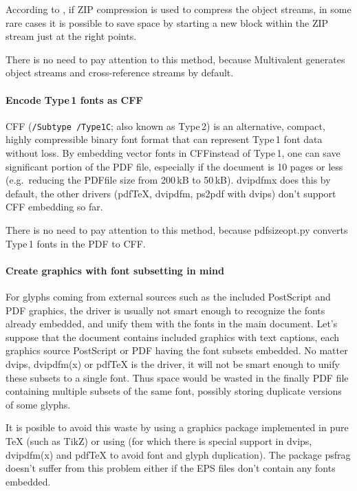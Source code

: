 \documentclass{ltugproc}
\def\cmd{\textsf}
\def\pkg{\textsf}
\begin{document}
According to \cite{pdf-diet}, if ZIP compression is used to compress the object
streams, in some rare cases it is possible to save space by starting a new
block within the ZIP stream just at the right points.

There is no need to pay attention to this method, because
Multivalent generates object streams and cross-reference streams by default.

\paragraph{Encode Type\,1 fonts as CFF}

CFF \cite{cff} (\texttt{/Subtype /Type1C}; also known as Type\,2) 
is an alternative, compact, highly compressible binary font
format that can represent Type\,1 font data without loss. By embedding
vector fonts in CFFinstead of Type\,1, one can
save significant portion of the PDF file, especially if the document is 10
pages or less (e.g.\ reducing the PDFfile size from 200\,kB to 50\,kB).
\cmd{dvipdfmx} does this by default, the other drivers (pdf\TeX{},
\cmd{dvipdfm}, \cmd{ps2pdf} with \cmd{dvips}) don't support CFF embedding so
far.

There is no need to pay attention to this method, because
\cmd{pdfsizeopt.py} converts Type\,1 fonts in the PDF to CFF. 

\paragraph{Create graphics with font subsetting in mind}

For glyphs coming from external sources such as the included PostScript and
PDF graphics, the driver is usually not smart enough to recognize the fonts
already embedded, and unify them with the fonts in the main document. Let's
suppose that the document contains included graphics with text captions,
each graphics source PostScript or PDF having the font subsets embedded. No
matter \cmd{dvips}, \cmd{dvipdfm(x)} or pdf\TeX{} is the driver, it will not
be smart enough to unify these subsets to a single font. Thus space would be
wasted in the finally PDF file containing multiple subsets of the same font,
possibly storing duplicate versions of some glyphs.

It is posible to avoid this waste by using a graphics package implemented in
pure \TeX{} (such as TikZ) or using \MP{} (for which there is
special support in \cmd{dvips}, \cmd{dvipdfm(x)} and pdf\TeX{} to avoid font
and glyph duplication). The package \pkg{psfrag} doesn't suffer from this
problem either if the EPS files don't contain any fonts embedded.
\end{document}
